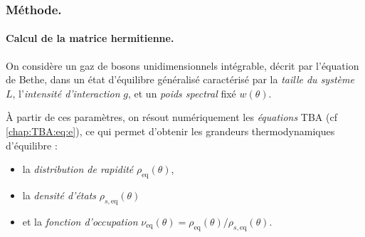 
\subsubsection{Méthode.} 

\paragraph{Calcul de la matrice hermitienne.}


On considère un gaz de bosons unidimensionnels intégrable, décrit par l'équation de Bethe, dans un état d'équilibre généralisé caractérisé par la {\em taille du système} \(L\), l'{\em intensité d'interaction} \(g\), et un {\em poids spectral} fixé \(w(\theta)\).

À partir de ces paramètres, on résout numériquement les {\em équations} \gls{TBA} (cf \eqref{chap:TBA:eq:e}), ce qui permet d'obtenir les grandeurs thermodynamiques d'équilibre :
\begin{itemize}[label = $\bullet$]
	\item la {\em distribution de rapidité} \( \rho_{\mathrm{eq}}(\theta) \),
	\item la {\em densité d'états} \( \rho_{s,\mathrm{eq}}(\theta) \)
	\item et la {\em fonction d'occupation} \( \nu_{\! \mathrm{eq}}(\theta) = \rho_{\! \mathrm{eq}}(\theta) / \rho_{\! s,\mathrm{eq}}(\theta) \).
\end{itemize}


